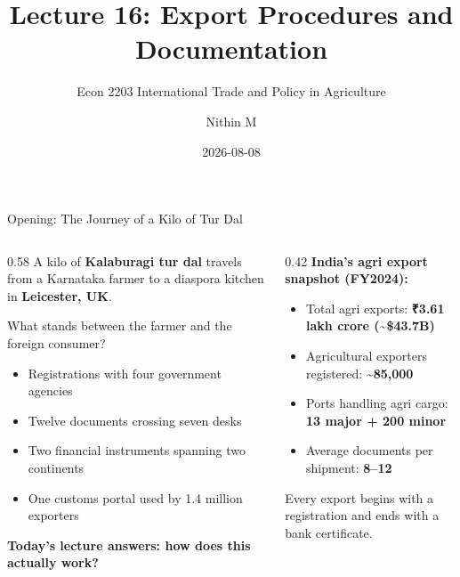 \documentclass[
  ignorenonframetext,
  aspectratio=169,
]{beamer}
\title[L16 \textbar{} Export Procedures]{Lecture 16: Export Procedures
and Documentation}
\subtitle{Econ 2203 \textbar{} International Trade and Policy in
Agriculture}
\author{Nithin M}
\date{2026-08-08}
\institute{Department of Development Economics}
\makeatletter
\providecommand{\tightlist}{%
  \setlength{\itemsep}{0pt}\setlength{\parskip}{0pt}}
\let\quarto@originallabel\label
\DeclareRobustCommand*{\label}[1]{\quarto@originallabel{#1}}
\makeatother
\begin{document}
\frame{\titlepage}


\begin{frame}
\begin{block}{Opening: The Journey of a Kilo of Tur Dal}
\label{opening-the-journey-of-a-kilo-of-tur-dal}
\begin{columns}[T]
\begin{column}{0.58\linewidth}
A kilo of \textbf{Kalaburagi tur dal} travels from a Karnataka farmer to
a diaspora kitchen in \textbf{Leicester, UK}.

What stands between the farmer and the foreign consumer?

\begin{itemize}
\tightlist
\item
  Registrations with four government agencies
\item
  Twelve documents crossing seven desks
\item
  Two financial instruments spanning two continents
\item
  One customs portal used by 1.4 million exporters
\end{itemize}

\textbf{Today's lecture answers: how does this actually work?}
\end{column}

\begin{column}{0.42\linewidth}
\textbf{India's agri export snapshot (FY2024):}

\begin{itemize}
\tightlist
\item
  Total agri exports: \textbf{₹3.61 lakh crore (\textasciitilde\$43.7B)}
\item
  Agricultural exporters registered: \textbf{\textasciitilde85,000}
\item
  Ports handling agri cargo: \textbf{13 major + 200 minor}
\item
  Average documents per shipment: \textbf{8--12}
\end{itemize}

Every export begins with a registration and ends with a bank
certificate.
\end{column}
\end{columns}
\end{block}
\end{frame}
\end{document}
